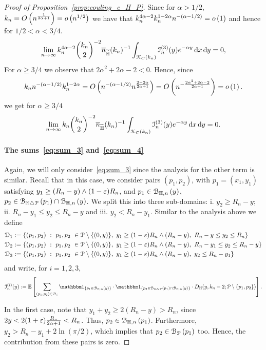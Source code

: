 \begin{proof}[Proof of Proposition~\ref{prop:couling_c_H_P}]
Since for $\alpha > 1/2$, $k_n = O\left(n^{\frac{1}{2\alpha +1}}\right) = o\left(n^{1/2}\right)$ we have that $k_n^{4\alpha - 2} k_n^{1 - 2\alpha} n^{-(\alpha - 1/2)} = o\left(1\right)$ and hence for $1/2 < \alpha < 3/4$.
\[
	\lim_{n \to \infty} k_n^{4\alpha - 2} \binom{k_n}{2}^{-2} \overline{n}_{\widetilde{\mathbb{H}}}(k_n)^{-1} \int_{{\mathcal K}_{C}(k_n)} \mathcal{I}_n^{(3)}(y) e^{-\alpha y} \operatorname{\mathrm{d}\hspace{-2pt}} x \operatorname{\mathrm{d}\hspace{-2pt}} y = 0,
\]
For $\alpha \ge 3/4$ we observe that $2\alpha^2 + 2\alpha - 2 < 0$. Hence, since
\[
 	k_n n^{-(\alpha - 1/2)} k_n^{1-2\alpha} = O\left(n^{-(\alpha - 1/2)} n^{\frac{2 - 2\alpha}{2\alpha + 1}}\right)
 	= O\left(n^{- \frac{2\alpha^2 + 2\alpha - 2}{2\alpha + 1}}\right) = o\left(1\right).
\]
we get for $\alpha \ge 3/4$
\[
	\lim_{n \to \infty} k_n \binom{k_n}{2}^{-2} \overline{n}_{\widetilde{\mathbb{H}}}(k_n)^{-1} \int_{{\mathcal K}_{C}(k_n)} \mathcal{I}_n^{(3)}(y) e^{-\alpha y} \operatorname{\mathrm{d}\hspace{-2pt}} x \operatorname{\mathrm{d}\hspace{-2pt}} y = 0.
\]



\paragraph{The sums~\eqref{eq:sum_3} and~\eqref{eq:sum_4}}
Again, we will only consider~\eqref{eq:sum_3} since the analysis for the other term is similar. Recall that in this case, we consider pairs $(p_1,p_2)$, with $p_1 = (x_1,y_1)$ satisfying 
$y_1 \geq (R_n - y) \wedge (1-\varepsilon)R_n$, and $p_1 \in {\mathcal B}_{\mathbb{H},n}\left(y\right)$, $p_2 \in {\mathcal B}_{\mathbb{H} \bigtriangleup {\mathcal P}}\left(p_1\right) \cap {\mathcal B}_{\mathbb{H},n}\left(y\right)$. 
We split this into three sub-domains:  i. $y_2 \geq R_n - y$; ii. $R_n -y_1 \leq y_2 \leq R_n -y$ and iii. $y_2 < R_n - y_1$. Similar to the analysis above we define
\begin{align*}
	\mathcal{D}_{1} &:= \{(p_1, p_2) \ : \  p_1,p_2 \ \in {\mathcal P} \setminus \{(0,y) \}, \ y_1 \geq (1-\varepsilon) R_n \wedge (R_n-y), 
		\ R_n -y \leq y_2 \leq R_n \}\\
	\mathcal{D}_{2} &:= \{(p_1, p_2) \ : \  p_1,p_2 \ \in {\mathcal P} \setminus \{(0,y) \}, \ y_1 \geq (1-\varepsilon) R_n \wedge (R_n-y), 
		\ R_n -y_1 \leq y_2 \leq R_n - y \}\\
	\mathcal{D}_{3} &:= \{(p_1, p_2) \ : \  p_1,p_2 \ \in {\mathcal P} \setminus \{(0,y) \}, \ y_1 \geq (1-\varepsilon) R_n \wedge (R_n-y), 
		\ y_2 \leq R_n - y_1 \}
\end{align*}
and write, for $i = 1,2,3$,
\[
	\mathcal{I}_n^{(i)}(y) := \Exp { \sum_{(p_1,p_2)  \in \dom{i}} 
	\ind{p_1 \in \BallHyp{y}} \cdot \ind{p_2 \in \BallSym{p_1} \cap \BallHyp{y}}
	\cdot D_\H (y,k_n-2;\Pcal \setminus \{ p_1, p_2\})}.
\]


In the first case, note that $y_1 + y_2 \geq 2(R_n - y) > R_n$, since $2y < 2(1+\varepsilon)
\frac{R_n}{2\alpha +1} < R_n$. Thus, $p_2 \in {\mathcal B}_{\mathbb{H},n}\left(p_1\right)$. Furthermore, 
$y_2 > R_n - y_1 + 2\ln (\pi/2)$, which implies that $p_2 \in {\mathcal B}_{{\mathcal P}}\left(p_1\right)$ too. 
Hence, the contribution from these pairs is zero.   


\end{proof}
